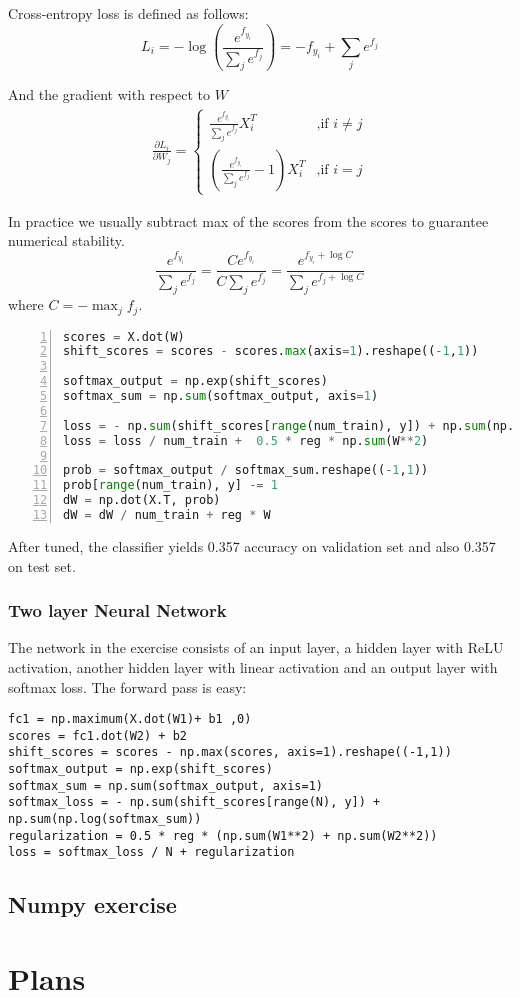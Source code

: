 \documentclass{article} %
\begin{document}
Cross-entropy loss is defined as follows:
$$L_i=-\log\left( \frac{e^{f_{y_i}}}{\sum_j e^{f_j}}\right)=-f_{y_i}+\sum_j e^{f_j}$$

And the gradient with respect to $W$
\begin{eqnarray*}
\frac{\partial L_i}{\partial W_j}=
\left\{ 
    \begin{array}{ll}
        \frac{e^{f_{y_i}}}{\sum_j e^{f_j}}X_i^T & \mbox{,if $i \ne j$}\\
        \left(\frac{e^{f_{y_i}}}{\sum_j e^{f_j}}-1\right)X_i^T & \mbox{,if $i = j$}
    \end{array}
\right.
\end{eqnarray*}

In practice we usually subtract max of the scores from the scores to guarantee numerical stability.
$$\frac{e^{f_{y_i}}}{\sum_j e^{f_j}}=\frac{Ce^{f_{y_i}}}{C\sum_j e^{f_j}}=\frac{e^{f_{y_i}+\log C}}{\sum_j e^{f_j+\log C}}$$
where $C=-\max_j f_j$.

\begin{lstlisting}[language=python, numbers=left]
scores = X.dot(W)
shift_scores = scores - scores.max(axis=1).reshape((-1,1))

softmax_output = np.exp(shift_scores)
softmax_sum = np.sum(softmax_output, axis=1)

loss = - np.sum(shift_scores[range(num_train), y]) + np.sum(np.log(softmax_sum))
loss = loss / num_train +  0.5 * reg * np.sum(W**2)

prob = softmax_output / softmax_sum.reshape((-1,1))
prob[range(num_train), y] -= 1
dW = np.dot(X.T, prob)
dW = dW / num_train + reg * W
\end{lstlisting}

After tuned, the classifier yields 0.357 accuracy on validation set and also 0.357 on test set.

\subsubsection{Two layer Neural Network}
The network in the exercise consists of an input layer, a hidden layer with ReLU activation, another hidden layer with linear activation and an output layer with softmax loss. The forward pass is easy:
\begin{lstlisting}
fc1 = np.maximum(X.dot(W1)+ b1 ,0)
scores = fc1.dot(W2) + b2
shift_scores = scores - np.max(scores, axis=1).reshape((-1,1))
softmax_output = np.exp(shift_scores)
softmax_sum = np.sum(softmax_output, axis=1)
softmax_loss = - np.sum(shift_scores[range(N), y]) + np.sum(np.log(softmax_sum))
regularization = 0.5 * reg * (np.sum(W1**2) + np.sum(W2**2))
loss = softmax_loss / N + regularization
\end{lstlisting} 

\subsection{Numpy exercise}


\section{Plans}
\end{document}
